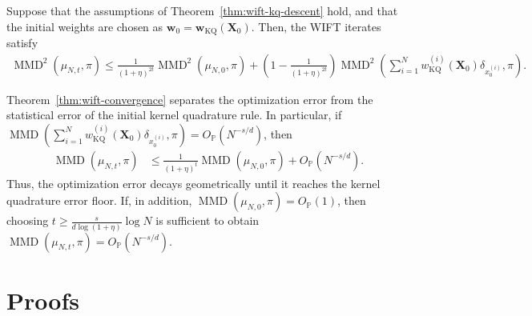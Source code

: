 \begin{theorem}
\label{thm:wift-convergence}
Suppose that the assumptions of Theorem~\ref{thm:wift-kq-descent} hold, and that the initial weights are chosen as $\bm{w}_0=\bm{w}_{\mathrm{KQ}}(\bm{X}_0)$. Then, the WIFT iterates satisfy
\begin{align*}
\operatorname{MMD}^2(\mu_{N,t},\pi) \leq
\frac{1}{(1+\eta)^{2t}}
\operatorname{MMD}^2(\mu_{N,0},\pi) +
\left(
1-\frac{1}{(1+\eta)^{2t}}
\right)
\operatorname{MMD}^2
\left(
\sum_{i=1}^N
w_{\mathrm{KQ}}^{(i)}(\bm{X}_0)
\delta_{x_0^{(i)}},
\pi
\right).
\end{align*}
\end{theorem}

\begin{rem}
Theorem~\ref{thm:wift-convergence} separates the optimization error from the
statistical error of the initial kernel quadrature rule. In particular, if
$\operatorname{MMD}(\sum_{i=1}^N
w_{\mathrm{KQ}}^{(i)}(\bm{X}_0)\delta_{x_0^{(i)}},\pi)
=O_{\mathbb{P}}(N^{-s/d})$, then
\begin{align*}
\operatorname{MMD}(\mu_{N,t},\pi)
&\leq \frac{1}{(1+\eta)^t}
\operatorname{MMD}(\mu_{N,0},\pi)
+O_{\mathbb{P}}(N^{-s/d}).
\end{align*}
Thus, the optimization error decays geometrically until it reaches the
kernel quadrature error floor. If, in addition,
$\operatorname{MMD}(\mu_{N,0},\pi)=O_{\mathbb{P}}(1)$, then choosing
$t\geq \frac{s}{d\log(1+\eta)}\log N$ is sufficient to obtain
$\operatorname{MMD}(\mu_{N,t},\pi)=O_{\mathbb{P}}(N^{-s/d})$.
\end{rem}

\section{Proofs}

